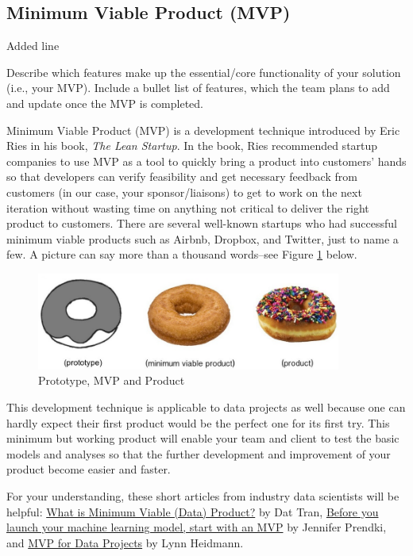 \documentclass{article}
\begin{document}
\subsection{Minimum Viable Product (MVP)}
Added line

Describe which features make up the essential/core functionality of your solution (i.e., your MVP).
Include a bullet list of features, which the team plans to add and update once the MVP is completed.

Minimum Viable Product (MVP) is a development technique introduced by Eric Ries in his book, \emph{The Lean Startup}. In the book, Ries recommended startup companies to use MVP as a tool to quickly bring a product into customers' hands so that developers can verify feasibility and get necessary feedback from customers (in our case, your sponsor/liaisons) to get to work on the next iteration without wasting time on anything not critical to deliver the right product to customers.\cite{ries2011lean} There are several well-known startups who had successful minimum viable products such as Airbnb, Dropbox, and Twitter, just to name a few. A picture can say more than a thousand words--see Figure \ref{fig:mvp-pic} below.

\begin{figure}[h]
\centering
\includegraphics[width=10cm]{prototype-mvp-product.jpg}
\caption{Prototype, MVP and Product}
\label{fig:mvp-pic} %
\small
\end{figure}

This development technique is applicable to data projects as well because one can hardly expect their first product would be the perfect one for its first try. This minimum but working product will enable your team and client to test the basic models and analyses so that the further development and improvement of your product become easier and faster.

For your understanding, these short articles from industry data scientists will be helpful: \href{https://medium.com/idealo-tech-blog/what-is-minimum-viable-data-product-49269e338d85}{What is Minimum Viable (Data) Product?} by Dat Tran, \href{https://venturebeat.com/2018/11/24/before-you-launch-your-machine-learning-model-start-with-an-mvp/}{Before you launch your machine learning model, start with an MVP} by Jennifer Prendki, and \href{https://blog.dataiku.com/mvp-for-data-projects}{MVP for Data Projects} by Lynn Heidmann. \cite{MVPforDP}  
\end{document}
